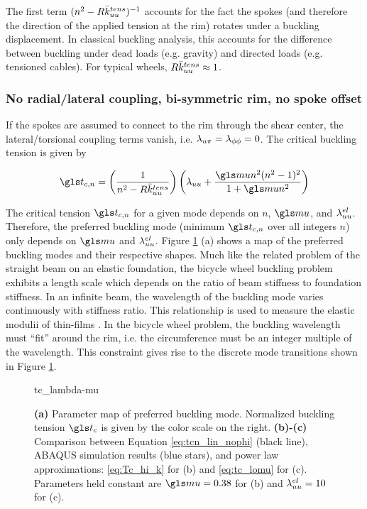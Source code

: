 \documentclass[\rootdir/thesis.tex]{subfiles}
\begin{document}
The first term $(n^2 - R\bar{k}_{uu}^{tens})^{-1}$ accounts for the fact the spokes (and therefore the direction of the applied tension at the rim) rotates under a buckling displacement. In classical buckling analysis, this accounts for the difference between buckling under dead loads (e.g. gravity) and directed loads (e.g. tensioned cables). For typical wheels, $R\bar{k}_{uu}^{tens} \approx 1$.

\subsubsection*{No radial/lateral coupling, bi-symmetric rim, no spoke offset}
If the spokes are assumed to connect to the rim through the shear center, the lateral/torsional coupling terms vanish, i.e. $\lambda_{u\pi}=\lambda_{\phi\phi}=0$. The critical buckling tension is given by

\begin{equation}
\label{eq:tcn_lin_nophi}
\ts_{c,n} = \left(\frac{1}{n^2 - R\kuu^{tens}}\right)
\left(\lr_{uu}
      +\frac{\m n^2(n^2-1)^2}
        {1 + \m n^2}\right)
\end{equation}

The critical tension $\ts_{c,n}$ for a given mode depends on $n$, $\m$, and $\lambda_{uu}^{el}$. Therefore, the preferred buckling mode (minimum $\ts_{c,n}$ over all integers $n$) only depends on $\m$ and $\lambda_{uu}^{el}$. Figure \ref{fig:tc_lambda_mu} (a) shows a map of the preferred buckling modes and their respective shapes. Much like the related problem of the straight beam on an elastic foundation, the bicycle wheel buckling problem exhibits a length scale which depends on the ratio of beam stiffness to foundation stiffness. In an infinite beam, the wavelength of the buckling mode varies continuously with stiffness ratio. This relationship is used to measure the elastic modulii of thin-films \cite{Suo Hutchinson or Huang}. In the bicycle wheel problem, the buckling wavelength must ``fit'' around the rim, i.e. the circumference must be an integer multiple of the wavelength. This constraint gives rise to the discrete mode transitions shown in Figure \ref{fig:tc_lambda_mu}.

\begin{figure}
\centering
{tc_lambda-mu}
\caption{\textbf{(a)} Parameter map of preferred buckling mode. Normalized buckling tension $\ts_c$ is given by the color scale on the right. \textbf{(b)-(c)} Comparison between Equation \eqref{eq:tcn_lin_nophi} (black line), ABAQUS simulation results (blue stars), and power law approximations: \eqref{eq:Tc_hi_k} for (b) and \eqref{eq:tc_lomu} for (c). Parameters held constant are $\m=0.38$ for (b) and $\lambda_{uu}^{el}=10$ for (c).}
\label{fig:tc_lambda_mu}
\end{figure}
\end{document}
